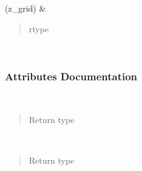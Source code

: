 \documentclass[letterpaper,10pt,english]{sphinxmanual}
\begin{document}
\begin{fulllineitems}
\begin{savenotes}
\begin{longtable}[c]{}
\endlastfoot

\sphinxAtStartPar
{\hyperref[\detokenize{api/seyfert.cosmology.bias.EuclidFlagshipGCphBias:seyfert.cosmology.bias.EuclidFlagshipGCphBias.computeBias}]{}}(z\_grid)
&
\sphinxAtStartPar
\begin{quote}\begin{description}
\item[{rtype}] \leavevmode
\sphinxAtStartPar
{}

\end{description}\end{quote}

\\
\hline
\end{longtable}\sphinxatlongtableend\end{savenotes}
\subsubsection*{Attributes Documentation}

\begin{fulllineitems}
\label{\detokenize{api/seyfert.cosmology.bias.EuclidFlagshipGCphBias:seyfert.cosmology.bias.EuclidFlagshipGCphBias.Aph}}~\begin{quote}\begin{description}
\item[{Return type}] \leavevmode
\sphinxAtStartPar
{}

\end{description}\end{quote}

\end{fulllineitems}


\begin{fulllineitems}
\label{\detokenize{api/seyfert.cosmology.bias.EuclidFlagshipGCphBias:seyfert.cosmology.bias.EuclidFlagshipGCphBias.Bph}}~\begin{quote}\begin{description}
\item[{Return type}] \leavevmode
\sphinxAtStartPar
{}


\end{description}
\end{quote}
\end{fulllineitems}
\end{fulllineitems}
\end{document}
